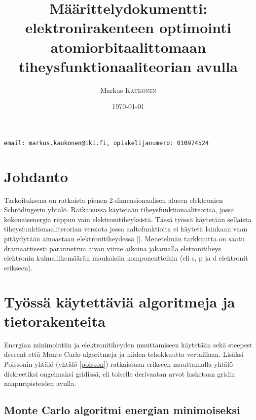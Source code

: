 \documentclass{article}
\title{Määrittelydokumentti: elektronirakenteen optimointi atomiorbitaalittomaan tiheysfunktionaaliteorian avulla} %
\author{Markus \textsc{Kaukonen} %
}
\date{\today} %
\begin{document}
\maketitle %
\hspace{1cm} \texttt{email: markus.kaukonen@iki.fi, opiskelijanumero: 010974524}

\newpage


\section{Johdanto}
Tarkoituksena on ratkaista pienen 2-dimensionaalisen alueen
elektronien Schrödingerin yhtälö. Ratkaisussa käytetään
tiheysfunktionaaliteoriaa, jossa kokonaisenergia riippuu vain
elektronitiheyksistä. Tässä työssä käytetään sellaista
tiheysfunktionaaliterorian versiota jossa aaltofunktioita ei käytetä
lainkaan vaan pitäydytään ainoastaan elektronitiheydessä
[\cite{ke2013angular}]. Menetelmän tarkkuutta on saatu dramaattisesti
parannetrua aivan viime aikoina jakamalla eletronitiheys elektronin
kulmaliikemäärän maukaisiin komponentteihin (eli s, p ja d elektronit
erikseen).

\section{Työssä käytettäviä algoritmeja ja tietorakenteita}
Energian minimointiin ja elektronitiheyden muuttamiseen käytetään sekä
steepest descent että Monte Carlo algoritmeja ja niiden tehokkuutta
vertaillaan. Lisäksi Poissonin yhtälö (yhtälö \ref{poisson}) ratkaistaan
erikseen muuttamalla yhtälö diskreetiksi ongelmaksi gridissä, eli
toiselle derivaatan arvot lasketaan gridin naapuripisteiden avulla.

\subsection{Monte Carlo algoritmi energian minimoiseksi}
\end{document}
